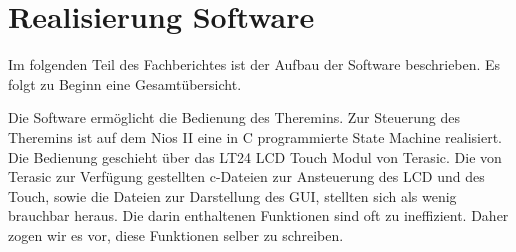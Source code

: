 \clearpage
\section{Realisierung Software}\label{sec:Realisierung_Software}
Im folgenden Teil des Fachberichtes ist der Aufbau der Software beschrieben. Es folgt zu Beginn eine Gesamtübersicht.

Die Software ermöglicht die Bedienung des Theremins. Zur Steuerung des Theremins ist auf dem Nios II eine in C programmierte State Machine realisiert. Die Bedienung geschieht über das LT24 LCD Touch Modul von Terasic. Die von Terasic zur Verfügung gestellten c-Dateien zur Ansteuerung des LCD und des Touch, sowie die Dateien zur Darstellung des GUI, stellten sich als wenig brauchbar heraus. Die darin enthaltenen Funktionen sind oft zu ineffizient. Daher zogen wir es vor, diese Funktionen selber zu schreiben.